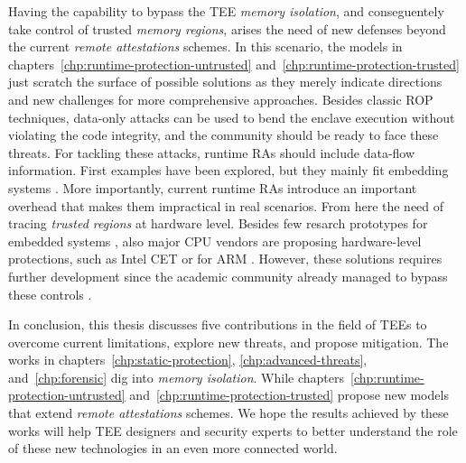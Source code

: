 Having the capability to bypass the TEE \emph{memory isolation}, and 
conseguentely take control of trusted  \emph{memory regions}, arises the need 
of new defenses beyond the current \emph{remote attestations} schemes.
In this scenario, the models in chapters~\ref{chp:runtime-protection-untrusted} 
and~\ref{chp:runtime-protection-trusted} just scratch the surface of 
possible solutions as they merely indicate directions and new challenges for 
more comprehensive approaches.
Besides classic ROP techniques, data-only attacks can be used to bend the 
enclave execution without violating the code integrity, and the community 
should be ready to face these threats.
For tackling these attacks, runtime RAs should include data-flow information.
First examples have been explored, but they mainly fit embedding systems 
\citep{sun2020oat,aberadiat}.
More importantly, current runtime RAs introduce an important overhead 
that makes them impractical in real scenarios.
From here the need of tracing \emph{trusted regions} at hardware level.
Besides few resarch prototypes for embedded systems 
\citep{Dessouky:2018:LLH:3240765.3240821}, also major CPU vendors are proposing 
hardware-level protections, such as Intel CET \citep{intelcet} or for ARM 
\citep{armpa}.
However, these solutions requires further development since the academic 
community already managed to bypass these controls \citep{van2012memory}.

In conclusion, this thesis discusses five contributions in the field of TEEs to 
overcome current limitations, explore new threats, and propose mitigation.
The works in chapters~\ref{chp:static-protection}, \ref{chp:advanced-threats}, 
and~\ref{chp:forensic} dig into \emph{memory isolation}.
While chapters~\ref{chp:runtime-protection-untrusted} 
and~\ref{chp:runtime-protection-trusted} propose new models that extend 
\emph{remote attestations} schemes.
We hope the results achieved by these works will help TEE designers and 
security experts to better understand the role of these new technologies in 
an even more connected world.


